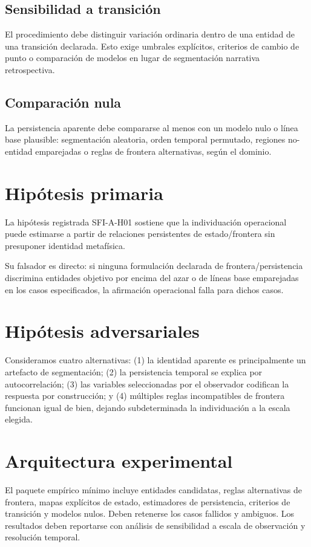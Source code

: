 \documentclass[11pt]{article}
\begin{document}
\subsection{Sensibilidad a transición}
El procedimiento debe distinguir variación ordinaria dentro de una entidad de una transición declarada. Esto exige umbrales explícitos, criterios de cambio de punto o comparación de modelos en lugar de segmentación narrativa retrospectiva.

\subsection{Comparación nula}
La persistencia aparente debe compararse al menos con un modelo nulo o línea base plausible: segmentación aleatoria, orden temporal permutado, regiones no-entidad emparejadas o reglas de frontera alternativas, según el dominio.

\section{Hipótesis primaria}
La hipótesis registrada SFI-A-H01 sostiene que la individuación operacional puede estimarse a partir de relaciones persistentes de estado/frontera sin presuponer identidad metafísica.

Su falsador es directo: si ninguna formulación declarada de frontera/persistencia discrimina entidades objetivo por encima del azar o de líneas base emparejadas en los casos especificados, la afirmación operacional falla para dichos casos.

\section{Hipótesis adversariales}
Consideramos cuatro alternativas: (1) la identidad aparente es principalmente un artefacto de segmentación; (2) la persistencia temporal se explica por autocorrelación; (3) las variables seleccionadas por el observador codifican la respuesta por construcción; y (4) múltiples reglas incompatibles de frontera funcionan igual de bien, dejando subdeterminada la individuación a la escala elegida.

\section{Arquitectura experimental}
El paquete empírico mínimo incluye entidades candidatas, reglas alternativas de frontera, mapas explícitos de estado, estimadores de persistencia, criterios de transición y modelos nulos. Deben retenerse los casos fallidos y ambiguos. Los resultados deben reportarse con análisis de sensibilidad a escala de observación y resolución temporal.
\end{document}
